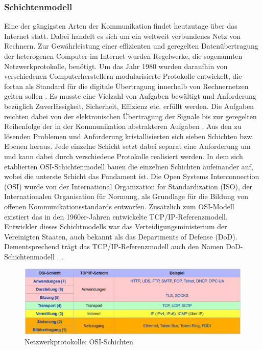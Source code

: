 \subsubsection{Schichtenmodell}
Eine der gängigsten Arten der Kommunikation findet heutzutage über das Internet statt. 
Dabei handelt es sich um ein weltweit verbundenes Netz von Rechnern. Zur Gewährleistung einer effizienten und geregelten Datenübertragung der heterogenen Computer im Internet wurden Regelwerke, die sogenannten Netzwerkprotokolle, benötigt.
Um das Jahr 1980 wurden daraufhin von verschiedenen Computerherstellern modularisierte Protokolle entwickelt, die fortan als Standard für die digitale Übertragung innerhalb von Rechnernetzen gelten sollen \cite{wikiNetzwerkprotokolle}.
Es musste eine Vielzahl von Aufgaben bewältigt und Anforderung bezüglich Zuverlässigkeit, Sicherheit, Effizienz etc. erfüllt werden. Die Aufgaben reichten dabei von der elektronischen Übertragung der Signale bis zur geregelten Reihenfolge der in der Kommunikation abstrakteren Aufgaben \cite{wikiOsiModell}.
Aus den zu lösenden Problemen und Anforderung kristallisierten sich sieben Schichten bzw. Ebenen heraus. 
Jede einzelne Schicht setzt dabei separat eine Anforderung um und kann dabei durch verschiedene Protokolle realisiert werden. In dem sich etablierten OSI-Schichtenmodell bauen die einzelnen Schichten aufeinander auf, wobei die unterste Schicht das Fundament ist. 
Die Open Systems Interconnection (OSI) wurde von der International Organization for Standardization (ISO), der Internationalen Organisation für Normung, als Grundlage für die Bildung von offenen Kommunikationsstandards entworfen. 
\newline
\noindent
Zusätzlich zum OSI-Modell existiert das in den 1960er-Jahren entwickelte TCP/IP-Referenz\-modell. Entwickler dieses Schichtmodells war das Verteidigungsministerium der Vereinigten Staaten, auch bekannt als das Departments of Defense (DoD). Dementsprechend trägt das TCP/IP-Referenzmodell auch den Namen DoD-Schichtenmodell \cite{wikiDodModell}. .

\begin{figure}[h]
\centering
\includegraphics[width=\textwidth]{images/Netzwerkprotokolle_OSI-Schicht.PNG}
\caption{Netzwerkprotokolle: OSI-Schichten \protect \footnotemark}
\end{figure}

